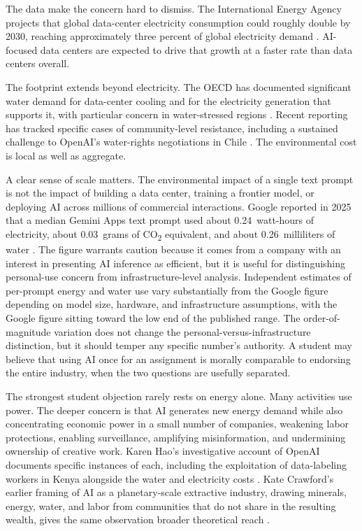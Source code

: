 \documentclass[12pt]{article}
\begin{document}
The data make the concern hard to dismiss. The International Energy Agency projects that global data-center electricity consumption could roughly double by 2030, reaching approximately three percent of global electricity demand \autocite{iea2025energy}. AI-focused data centers are expected to drive that growth at a faster rate than data centers overall.

The footprint extends beyond electricity. The OECD has documented significant water demand for data-center cooling and for the electricity generation that supports it, with particular concern in water-stressed regions \autocite{oecd2025hidden}. Recent reporting has tracked specific cases of community-level resistance, including a sustained challenge to OpenAI's water-rights negotiations in Chile \autocite{hao2025empire}. The environmental cost is local as well as aggregate.

A clear sense of scale matters. The environmental impact of a single text prompt is not the impact of building a data center, training a frontier model, or deploying AI across millions of commercial interactions. Google reported in 2025 that a median Gemini Apps text prompt used about 0.24~watt-hours of electricity, about 0.03~grams of CO\textsubscript{2} equivalent, and about 0.26~milliliters of water \autocite{googlecloud2025measuring}. The figure warrants caution because it comes from a company with an interest in presenting AI inference as efficient, but it is useful for distinguishing personal-use concern from infrastructure-level analysis. Independent estimates of per-prompt energy and water use vary substantially from the Google figure depending on model size, hardware, and infrastructure assumptions, with the Google figure sitting toward the low end of the published range. The order-of-magnitude variation does not change the personal-versus-infrastructure distinction, but it should temper any specific number's authority. A student may believe that using AI once for an assignment is morally comparable to endorsing the entire industry, when the two questions are usefully separated.

The strongest student objection rarely rests on energy alone. Many activities use power. The deeper concern is that AI generates new energy demand while also concentrating economic power in a small number of companies, weakening labor protections, enabling surveillance, amplifying misinformation, and undermining ownership of creative work. Karen Hao's investigative account of OpenAI documents specific instances of each, including the exploitation of data-labeling workers in Kenya alongside the water and electricity costs \autocite{hao2025empire}. Kate Crawford's earlier framing of AI as a planetary-scale extractive industry, drawing minerals, energy, water, and labor from communities that do not share in the resulting wealth, gives the same observation broader theoretical reach \autocite{crawford2021atlas}.
\end{document}
